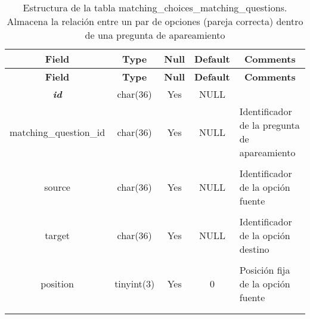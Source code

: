 %
%
\begin{longtable}{c c c c l}
	\multicolumn{1}{c}{\textbf{Field}} &
	\multicolumn{1}{c}{\textbf{Type}} &
	\multicolumn{1}{c}{\textbf{Null}} &
	\multicolumn{1}{c}{\textbf{Default}} &
	\multicolumn{1}{c}{\textbf{Comments}} \\ \hline \hline
\endfirsthead
	\multicolumn{1}{c}{\textbf{Field}} &
	\multicolumn{1}{c}{\textbf{Type}} &
	\multicolumn{1}{c}{\textbf{Null}} &
	\multicolumn{1}{c}{\textbf{Default}} &
	\multicolumn{1}{c}{\textbf{Comments}} \\ \hline \hline
\endhead \endfoot
	\textbf{\textit{id}} & char(36) & Yes & NULL \\ \hline 
	matching\_question\_id & char(36) & Yes & NULL & \parbox[t]{0.35\textwidth}{Identificador de la pregunta de apareamiento} \\ \\  \hline
	source & char(36) & Yes & NULL & \parbox[t]{0.35\textwidth}{Identificador de la opción fuente} \\ \\  \hline
	target & char(36) & Yes & NULL & \parbox[t]{0.35\textwidth}{Identificador de la opción destino} \\ \\  \hline
	position & tinyint(3) & Yes & 0 & \parbox[t]{0.35\textwidth}{Posición fija de la opción fuente} \\ \\  \hline
\caption[Estructura de la tabla matching\_choices\_matching\_questions]{Estructura de la tabla matching\_choices\_matching\_questions. Almacena la relación entre un par de opciones (pareja correcta) dentro de una pregunta de apareamiento} \label{tab:quiz_matching_choices_matching_questions-structure} \\ 
\end{longtable}

